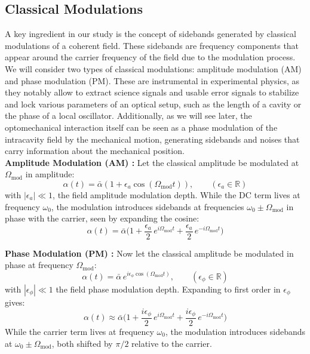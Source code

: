 \subsection{Classical Modulations}
A key ingredient in our study is the concept of sidebands generated by classical modulations of a coherent field. These sidebands are frequency components that appear around the carrier frequency of the field due to the modulation process. We will consider two types of classical modulations: amplitude modulation (AM) and phase modulation (PM). These are instrumental in experimental physics, as they notably allow to extract science signals and usable error signals to stabilize and lock various parameters of an optical setup, such as the length of a cavity or the phase of a local oscillator. Additionally, as we will see later, the optomechanical interaction itself can be seen as a phase modulation of the intracavity field by the mechanical motion, generating sidebands and noises that carry information about the mechanical position. \\ 

\noindent \textbf{Amplitude Modulation (AM) :} Let the classical amplitude be modulated at $\Omega_{\text{mod}}$ in amplitude:
\begin{equation}
  \alpha(t) = \bar{\alpha} \left(1 + \epsilon_a \cos(\Omega_{\text{mod}} t)\right), \quad \quad (\epsilon_a \in \mathbb{R})
\end{equation}
with $|\epsilon_a| \ll 1$, the field amplitude modulation depth. While the DC term lives at frequency $\omega_0$, the modulation introduces sidebands at frequencies $\omega_0 \pm \Omega_{\text{mod}}$ in phase with the carrier, seen by expanding the cosine:
\begin{equation}
  \alpha(t) = \bar{\alpha} \Big( 1 + \frac{\epsilon_a }{2}\, e^{i\Omega_{\text{mod}} t} + \frac{\epsilon_a }{2} \,  e^{-i\Omega_{\text{mod}} t} \Big)
\end{equation}


\noindent \textbf{Phase Modulation (PM) :} Now let the classical amplitude be modulated in phase at frequency $\Omega_{\mathrm{mod}}$:
\begin{equation}
\alpha(t) = \bar{\alpha} \, e^{i \epsilon_{\phi} \cos(\Omega_{\mathrm{mod}} t)}, \quad \quad (\epsilon_{\phi} \in \mathbb{R})
\label{eq:PM_def}
\end{equation}
with $|\epsilon_{\phi}| \ll 1$ the field phase modulation depth. Expanding to first order in $\epsilon_{\phi}$ gives:
\begin{equation}
\alpha(t) \approx \bar{\alpha} \Big( 1 + \frac{i \epsilon_{\phi} }{2} \, e^{i\Omega_{\mathrm{mod}} t} + \frac{i \epsilon_{\phi} }{2} \, e^{-i\Omega_{\mathrm{mod}} t} \Big)
\label{eq:PM_expand}
\end{equation}
While the carrier term lives at frequency $\omega_0$, the modulation introduces sidebands at $\omega_0 \pm \Omega_{\mathrm{mod}}$, both shifted by $\pi/2$ relative to the carrier.\\ 


